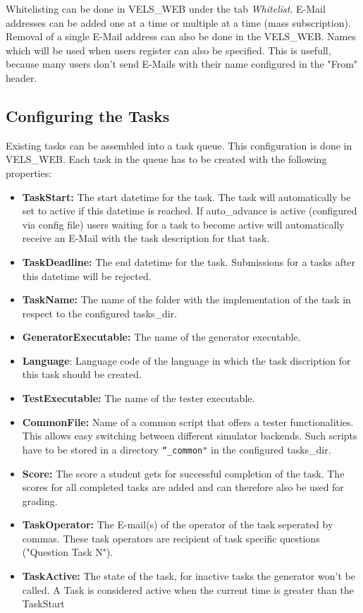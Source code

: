 Whitelisting can be done in VELS\_WEB under the tab {\it Whitelist}. E-Mail addresses can be added
one at a time or multiple at a time (mass subscription). Removal of a single E-Mail address
can also be done in the VELS\_WEB. Names which will be used when users register can also be
specified. This is usefull, because many users don't send E-Mails with their name configured
in the "From" header.

\subsection{Configuring the Tasks} \label{sub:configTasks}
Existing tasks can be assembled into a task queue. This configuration is done in VELS\_WEB.
Each task in the queue has to be created with the following properties:
\begin{itemize}
\item {\bf TaskStart:} The start datetime for the task. The task will automatically
    be set to active if this datetime is reached. If auto\_advance is active (configured
    via config file) users waiting for a task to become active will automatically
    receive an E-Mail with the task description for that task.
\item {\bf TaskDeadline:} The end datetime for the task. Submissions for a tasks after
    this datetime will be rejected.
\item {\bf TaskName:} The name of the folder with the implementation of the task in respect
	to the configured tasks\_dir.
\item {\bf GeneratorExecutable:} The name of the generator executable.
\item {\bf Language}: Language code of the language in which the task discription for
	this task should be created.
\item {\bf TestExecutable:} The name of the tester executable.
\item {\bf CommonFile:} Name of a common script that offers a tester functionalities. This allows easy
	switching between different simulator backends.	Such scripts have to be stored in a directory
	{\tt ``\_common"} in the configured
	tasks\_dir.
\item {\bf Score:} The score a student gets for successful completion of the task. The
    scores for all completed tasks are added and can therefore also be used for grading.
\item {\bf TaskOperator:} The E-mail(s) of the operator of the task seperated by commas.
	These task operators are recipient of task specific questions ("Question Task N").
\item {\bf TaskActive:} The state of the task, for inactive tasks the generator won't
    be called. A Task is considered active when the current time is greater than the
    TaskStart
\end{itemize}

